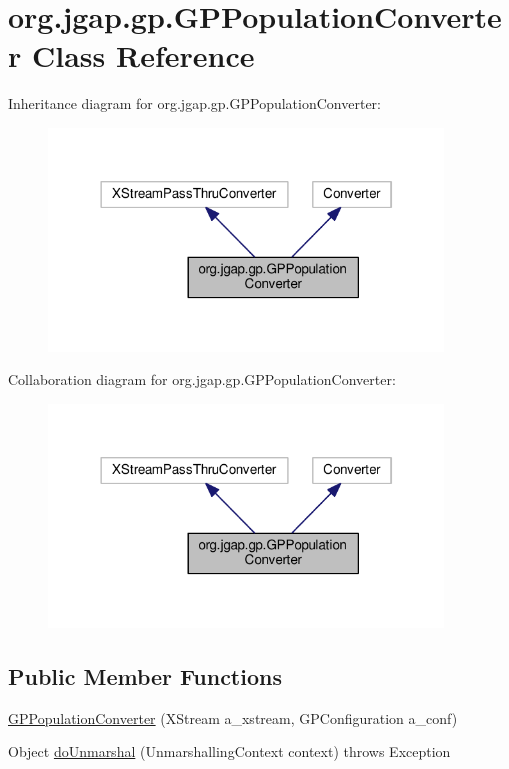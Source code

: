 \hypertarget{classorg_1_1jgap_1_1gp_1_1_g_p_population_converter}{\section{org.\-jgap.\-gp.\-G\-P\-Population\-Converter Class Reference}
\label{classorg_1_1jgap_1_1gp_1_1_g_p_population_converter}
}


Inheritance diagram for org.\-jgap.\-gp.\-G\-P\-Population\-Converter\-:
\nopagebreak
\begin{figure}[H]
\begin{center}
\leavevmode
\includegraphics[width=297pt]{classorg_1_1jgap_1_1gp_1_1_g_p_population_converter__inherit__graph}
\end{center}
\end{figure}


Collaboration diagram for org.\-jgap.\-gp.\-G\-P\-Population\-Converter\-:
\nopagebreak
\begin{figure}[H]
\begin{center}
\leavevmode
\includegraphics[width=297pt]{classorg_1_1jgap_1_1gp_1_1_g_p_population_converter__coll__graph}
\end{center}
\end{figure}
\subsection*{Public Member Functions}
\begin{DoxyCompactItemize}
\item 
\hyperlink{classorg_1_1jgap_1_1gp_1_1_g_p_population_converter_a097a4cba7d3c8156f028c3953a85b3d9}{G\-P\-Population\-Converter} (X\-Stream a\-\_\-xstream, G\-P\-Configuration a\-\_\-conf)
\item 
Object \hyperlink{classorg_1_1jgap_1_1gp_1_1_g_p_population_converter_abf65a2d8b8fd1c2b8d4e76df2b5c169b}{do\-Unmarshal} (Unmarshalling\-Context context)  throws Exception 
\end{DoxyCompactItemize}
